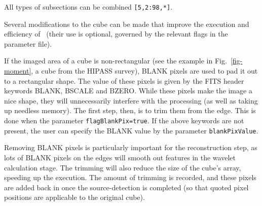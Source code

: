 All types of subsections can be combined \eg \texttt{[5,2:98,*]}.


%
%

\label{sec-modify}

Several modifications to the cube can be made that improve the
execution and efficiency of \duchamp\ (their use is optional, governed
by the relevant flags in the parameter file).


If the imaged area of a cube is non-rectangular (see the example in
Fig.~\ref{fig-moment}, a cube from the HIPASS survey), BLANK pixels are
used to pad it out to a rectangular shape. The value of these pixels
is given by the FITS header keywords BLANK, BSCALE and BZERO. While
these pixels make the image a nice shape, they will unnecessarily
interfere with the processing (as well as taking up needless
memory). The first step, then, is to trim them from the edge. This is
done when the parameter \texttt{flagBlankPix=true}. If the above
keywords are not present, the user can specify the BLANK value by the
parameter \texttt{blankPixValue}.

Removing BLANK pixels is particularly important for the reconstruction
step, as lots of BLANK pixels on the edges will smooth out features in
the wavelet calculation stage. The trimming will also reduce the size
of the cube's array, speeding up the execution. The amount of trimming
is recorded, and these pixels are added back in once the
source-detection is completed (so that quoted pixel positions are
applicable to the original cube).

